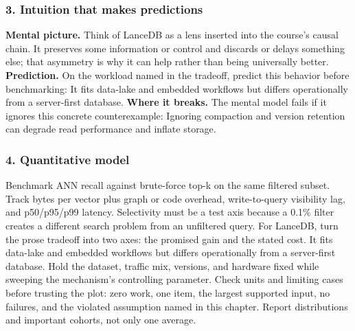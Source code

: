 \subsubsection*{3. Intuition that makes predictions}
\textbf{Mental picture.} Think of LanceDB as a lens inserted into the course's causal chain. It preserves some information or control and discards or delays something else; that asymmetry is why it can help rather than being universally better.
\textbf{Prediction.} On the workload named in the tradeoff, predict this behavior before benchmarking: It fits data-lake and embedded workflows but differs operationally from a server-first database.
\textbf{Where it breaks.} The mental model fails if it ignores this concrete counterexample: Ignoring compaction and version retention can degrade read performance and inflate storage.
\subsubsection*{4. Quantitative model}
Benchmark ANN recall against brute-force top-k on the same filtered subset. Track bytes per vector plus graph or code overhead, write-to-query visibility lag, and p50/p95/p99 latency. Selectivity must be a test axis because a 0.1\% filter creates a different search problem from an unfiltered query.
For LanceDB, turn the prose tradeoff into two axes: the promised gain and the stated cost. It fits data-lake and embedded workflows but differs operationally from a server-first database. Hold the dataset, traffic mix, versions, and hardware fixed while sweeping the mechanism's controlling parameter.
Check units and limiting cases before trusting the plot: zero work, one item, the largest supported input, no failures, and the violated assumption named in this chapter. Report distributions and important cohorts, not only one average.
